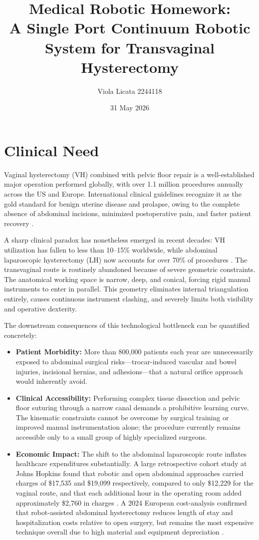\documentclass{article}
\title{Medical Robotic Homework:\\ A Single Port Continuum Robotic System for Transvaginal Hysterectomy}
\author{Viola Licata 2244118}
\date{31 May 2026}
\begin{document}
\maketitle

\section{Clinical Need}

Vaginal hysterectomy (VH) combined with pelvic floor repair is a well-established major operation performed globally, with over 1.1 million procedures annually across the US and Europe. International clinical guidelines recognize it as the gold standard for benign uterine disease and prolapse, owing to the complete absence of abdominal incisions, minimized postoperative pain, and faster patient recovery \cite{acog2017choosing}.

A sharp clinical paradox has nonetheless emerged in recent decades: VH utilization has fallen to less than 10--15\% worldwide, while abdominal laparoscopic hysterectomy (LH) now accounts for over 70\% of procedures \cite{trendsVaginalHyst2025}. The transvaginal route is routinely abandoned because of severe geometric constraints. The anatomical working space is narrow, deep, and conical, forcing rigid manual instruments to enter in parallel. This geometry eliminates internal triangulation entirely, causes continuous instrument clashing, and severely limits both visibility and operative dexterity.

The downstream consequences of this technological bottleneck can be quantified concretely:

\begin{itemize}
    \item \textbf{Patient Morbidity:} More than 800,000 patients each year are unnecessarily exposed to abdominal surgical risks---trocar-induced vascular and bowel injuries, incisional hernias, and adhesions---that a natural orifice approach would inherently avoid.
    \item \textbf{Clinical Accessibility:} Performing complex tissue dissection and pelvic floor suturing through a narrow canal demands a prohibitive learning curve. The kinematic constraints cannot be overcome by surgical training or improved manual instrumentation alone; the procedure currently remains accessible only to a small group of highly specialized surgeons.
    \item \textbf{Economic Impact:} The shift to the abdominal laparoscopic route inflates healthcare expenditures substantially. A large retrospective cohort study at Johns Hopkins found that robotic and open abdominal approaches carried charges of \$17,535 and \$19,099 respectively, compared to only \$12,229 for the vaginal route, and that each additional hour in the operating room added approximately \$2,760 in charges \cite{kohn2023cost}. A 2024 European cost-analysis confirmed that robot-assisted abdominal hysterectomy reduces length of stay and hospitalization costs relative to open surgery, but remains the most expensive technique overall due to high material and equipment depreciation \cite{louwerse2024cost}.
\end{itemize}
\end{document}
